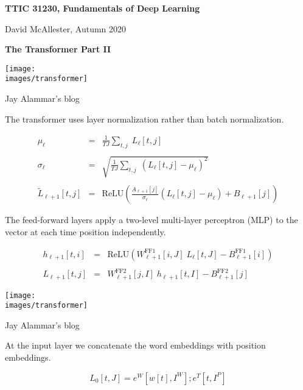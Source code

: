 




{\Huge
  \centerline{\bf TTIC 31230,  Fundamentals of Deep Learning}
  \vfill
  \centerline{David McAllester, Autumn 2020}
  \vfill
  \centerline{\bf  The Transformer Part II}
  \vfill
  \vfill


\centerline{\texttt{[image: \\images/transformer]}}

{\Large
\centerline{Jay Alammar's blog}
}


The transformer uses layer normalization rather than batch normalization.

\vfill
\begin{eqnarray*}
  \mu_\ell & = & \frac{1}{TJ} \sum_{t,j} \;L_\ell[t,j] \\
  \\
  \sigma_{\ell} & = & \sqrt{\frac{1}{TJ} \sum_{t,j}\;(L_\ell[t,j] - \mu_\ell)^2} \\
  \\
  \tilde{L}_{\ell+1}[t,j] & = & \mathrm{ReLU}\left(\frac{A_{\ell+1}[j]}{\sigma_\ell}(L_\ell[t,j] -\mu_\ell) + B_{\ell+1}[j]\right)
\end{eqnarray*}


The feed-forward layers apply a two-level multi-layer perceptron (MLP) to the vector at each time position independently.

\vfill

\begin{eqnarray*}
h_{\ell+1}[t,i] & = & \mathrm{ReLU}(W^{\mathrm{FF1}}_{\ell+1}[i,J]\;L_\ell[t,J] - B^{\mathrm{FF1}}_{\ell+1}[i]) \\
\\
L_{\ell+1}[t,j] & = & W^{\mathrm{FF2}}_{\ell+1}[j,I]\;h_{\ell+1}[t,I] - B^\mathrm{FF2}_{\ell+1}[j]
\end{eqnarray*}


\centerline{\texttt{[image: \\images/transformer]}}

{\huge
\centerline{Jay Alammar's blog}
}


At the input layer we concatenate the word embeddings with position embeddings.

\vfill
{\color{red} $$L_0[t,J] = e^W[w[t],I^W];e^T[t,I^P]$$}

}
